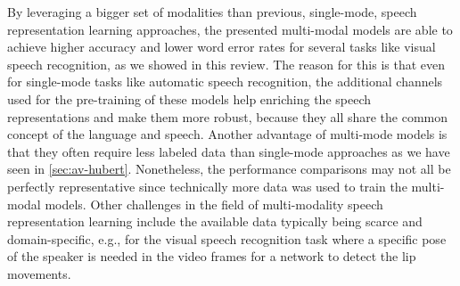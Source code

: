 By leveraging a bigger set of modalities than previous, single-mode, speech representation learning approaches, the presented multi-modal models are able to achieve higher accuracy and lower word error rates for several tasks like visual speech recognition, as we showed in this review. The reason for this is that even for single-mode tasks like automatic speech recognition, the additional channels used for the pre-training of these models help enriching the speech representations and make them more robust, because they all share the common concept of the language and speech. Another advantage of multi-mode models is that they often require less labeled data than single-mode approaches as we have seen in \ref{sec:av-hubert}. Nonetheless, the performance comparisons may not all be perfectly representative since technically more data was used to train the multi-modal models. Other challenges in the field of multi-modality speech representation learning include the available data typically being scarce and domain-specific, e.g., for the visual speech recognition task where a specific pose of the speaker is needed in the video frames for a network to detect the lip movements.